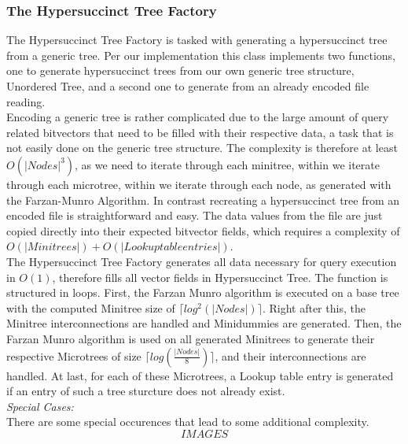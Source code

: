\documentclass{article}
\begin{document}
\subsubsection{The Hypersuccinct Tree Factory}
The Hypersuccinct Tree Factory is tasked with generating a hypersuccinct tree from a generic tree. Per our implementation this class implements two functions, one to generate hypersuccinct trees from our own generic tree structure, Unordered Tree, 
and a second one to generate from an already encoded file reading.\\
Encoding a generic tree is rather complicated due to the large amount of query related bitvectors that need to be filled with their respective data, a task that is not easily done on the generic tree structure. The complexity is therefore at least $O(|Nodes|^3)$, as we need to iterate through each minitree, within we iterate through each microtree, within we iterate through each node, as generated with the Farzan-Munro Algorithm.
In contrast recreating a hypersuccinct tree from an encoded file is straightforward and easy. The data values from the file are just copied directly into their expected bitvector fields, which requires a complexity of $O(|Minitrees|) + O(|Lookup table entries|)$.\\
The Hypersuccinct Tree Factory generates all data necessary for query execution in $O(1)$, therefore fills all vector fields in Hypersuccinct Tree. The function is structured in loops. First, the Farzan Munro algorithm is executed on a base tree with the computed Minitree size of $\lceil log^2( |Nodes| ) \rceil$. Right after this, the Minitree interconnections are handled and Minidummies are generated. Then, the Farzan Munro algorithm is used on all generated Minitrees to generate their respective Microtrees of size $\lceil log( \frac{|Nodes|}{8} ) \rceil$, and their interconnections are handled. At last, for each of these Microtrees, a Lookup table entry is generated if an entry of such a tree sturcture does not already exist.\\
\textit{Special Cases:}\\
There are some special occurences that lead to some additional complexity.\\
$$IMAGES$$
\end{document}
